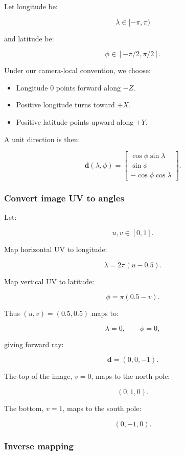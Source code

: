 Let longitude be:

\[ \lambda\in[-\pi,\pi) \]

and latitude be:

\[ \phi\in[-\pi/2,\pi/2]. \]

Under our camera-local convention, we choose:

\begin{itemize}
\tightlist
\item
  Longitude \(0\) points forward along \(-Z\).
\item
  Positive longitude turns toward \(+X\).
\item
  Positive latitude points upward along \(+Y\).
\end{itemize}

A unit direction is then:

\[ \boxed{ \mathbf d(\lambda,\phi)= \begin{bmatrix} \cos\phi\sin\lambda\\ \sin\phi\\ -\cos\phi\cos\lambda \end{bmatrix}. } \]

\subsubsection{Convert image UV to angles}\label{convert-image-uv-to-angles}

Let:

\[ u,v\in[0,1]. \]

Map horizontal UV to longitude:

\[ \boxed{ \lambda=2\pi(u-0.5). } \]

Map vertical UV to latitude:

\[ \boxed{ \phi=\pi(0.5-v). } \]

Thus \((u,v)=(0.5,0.5)\) maps to:

\[ \lambda=0,\qquad\phi=0, \]

giving forward ray:

\[ \boxed{\mathbf d=(0,0,-1)}. \]

The top of the image, \(v=0\), maps to the north pole:

\[ (0,1,0). \]

The bottom, \(v=1\), maps to the south pole:

\[ (0,-1,0). \]

\subsubsection{Inverse mapping}\label{inverse-mapping}

